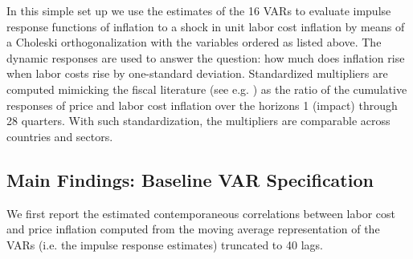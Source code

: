 \documentclass[11pt]{article}
\begin{document}
In this simple set up we use the estimates of the 16 VARs to evaluate impulse response functions of inflation to a shock in unit labor cost inflation by means of a Choleski orthogonalization with the variables ordered as listed above. The dynamic responses are used to answer the question: how much does inflation rise when labor costs rise by one-standard deviation. Standardized multipliers are computed mimicking the fiscal literature (see e.g. \cite{MountfordUhlig09}) as the ratio of the cumulative responses of price and labor cost inflation over the horizons 1 (impact) through 28 quarters. With such standardization, the multipliers are comparable across countries and sectors.

\subsection{Main Findings: Baseline VAR Specification}
We first report the estimated contemporaneous correlations between labor cost and price inflation computed from the moving average representation of the VARs (i.e. the impulse response estimates) truncated to 40 lags. 
\end{document}
